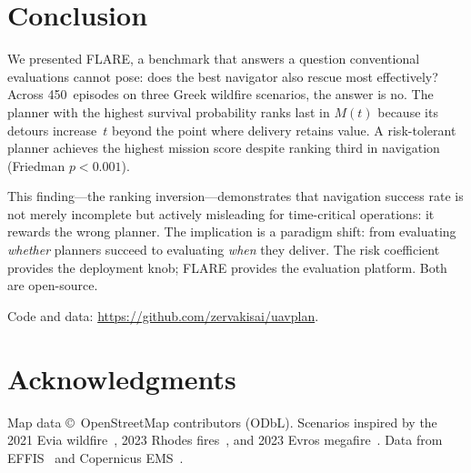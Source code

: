\documentclass[conference]{IEEEtran}
\begin{document}
\section{Conclusion}\label{sec:conclusion}

We presented FLARE, a benchmark that answers a question conventional
evaluations cannot pose: does the best navigator also rescue most
effectively? Across 450~episodes on three Greek wildfire scenarios, the
answer is no. The planner with the highest survival probability ranks last in
$M(t)$ because its detours increase~$t$ beyond the point where
delivery retains value. A risk-tolerant planner achieves the highest
mission score despite ranking third in navigation (Friedman $p < 0.001$).

This finding---the ranking inversion---demonstrates that navigation success
rate is not merely incomplete but actively misleading for time-critical
operations: it rewards the wrong planner. The implication is a paradigm shift: from
evaluating \emph{whether} planners succeed to evaluating \emph{when} they
deliver. The risk coefficient provides the deployment knob; FLARE provides
the evaluation platform. Both are open-source.

Code and data: \url{https://github.com/zervakisai/uavplan}.

\section*{Acknowledgments}

Map data \copyright~OpenStreetMap contributors (ODbL). Scenarios inspired
by the 2021 Evia wildfire~\cite{effis2021,copernicus_evia2021}, 2023
Rhodes fires~\cite{copernicus_emsr675}, and 2023 Evros
megafire~\cite{copernicus_emsn166,effis2023}. Data from
EFFIS~\cite{effis2021,effis2023} and Copernicus
EMS~\cite{copernicus_evia2021,copernicus_emsr675,copernicus_emsn166}.



\end{document}
